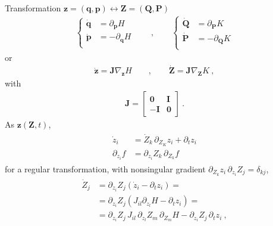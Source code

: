 \documentclass[letterpaper,10pt,english]{jupyterBook}
\begin{document}
\sphinxAtStartPar
Transformation \(\mathbf{z} = (\mathbf{q}, \mathbf{p}) \leftrightarrow  \mathbf{Z} = (\mathbf{Q}, \mathbf{P})\)
\begin{equation*}
\begin{split}
\left\{ \begin{aligned}
  \dot{\mathbf{q}} & = \partial_{\mathbf{p}} H \\
  \dot{\mathbf{p}} & =-\partial_{\mathbf{q}} H \\
\end{aligned} \right.
\qquad , \qquad
\left\{ \begin{aligned}
  \dot{\mathbf{Q}} & = \partial_{\mathbf{P}} K \\
  \dot{\mathbf{P}} & =-\partial_{\mathbf{Q}} K \\
\end{aligned} \right.
\end{split}
\end{equation*}
\sphinxAtStartPar
or
\begin{equation*}
\begin{split}
 \dot{\mathbf{z}} = \mathbf{J} \nabla_{\mathbf{z}} H
 \qquad , \qquad
 \dot{\mathbf{Z}} = \mathbf{J} \nabla_{\mathbf{Z}} K \ ,
\end{split}
\end{equation*}
\sphinxAtStartPar
with
\begin{equation*}
\begin{split}\mathbf{J} = \begin{bmatrix} \mathbf{0} & \mathbf{I} \\ -\mathbf{I} & \mathbf{0} \end{bmatrix} \ .\end{split}
\end{equation*}
\sphinxAtStartPar
As \(\mathbf{z}(\mathbf{Z},t)\),
\begin{equation*}
\begin{split}\begin{aligned}
  \dot{z}_i        & = \dot{Z}_k \, \partial_{Z_K} z_i + \partial_t z_i \\
  \partial_{z_i} f & = \partial_{z_i} Z_k \, \partial_{Z_k} f
\end{aligned}\end{split}
\end{equation*}
\sphinxAtStartPar
for a regular transformation, with non\sphinxhyphen{}singular gradient \(\partial_{Z_k} z_i \, \partial_{z_i} Z_j = \delta_{kj}\),
\begin{equation*}
\begin{split}\begin{aligned}
  \dot{Z}_j
  & = \partial_{z_i} Z_j \left( \dot{z}_i - \partial_t z_i \right) = \\
  & = \partial_{z_i} Z_j \left( J_{il} \partial_{z_l} H - \partial_t z_i \right) = \\
  & = \partial_{z_i} Z_j \, J_{il} \, \partial_{z_l} Z_{m} \, \partial_{Z_m} H -  \partial_{z_i} Z_j \, \partial_t z_i \ ,
\end{aligned}\end{split}
\end{equation*}
\end{document}

